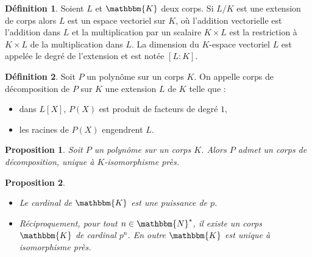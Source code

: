 \documentclass[12pt]{article}
\newcommand{\N}{\mathbbm{N}}
\newcommand{\K}{\mathbbm{K}}
\newtheorem{prop}{Proposition}
\theoremstyle{definition}
\newtheorem{definition}{Définition}
\begin{document}
\begin{definition}
Soient $L$ et $\K$ deux corps. Si $L/K$ est une extension de corps alors $L$ est un espace vectoriel sur $K$, où l'addition vectorielle est l'addition dans $L$ et la multiplication par un scalaire $K \times L$ est la restriction à $K \times L$ de la multiplication dans $L$. La dimension du $K$-espace vectoriel $L$ est appelée le degré de l'extension et est notée $[L:K]$.
\end{definition}
\vspace{12pt}
\begin{definition}
Soit $P$ un polynôme sur un corps $K$. On appelle corps de décomposition de $P$ sur $K$ une extension $L$ de $K$ telle que :
\begin{itemize}
\item dans $L[X]$, $P(X)$ est produit de facteurs de degré $1$,
\item les racines de $P(X)$ engendrent $L$.
\end{itemize}
\end{definition}
\vspace{12pt}
\begin{prop}
Soit $P$ un polynôme sur un corps $K$. Alors $P$ admet un corps de décomposition, unique à $K$-isomorphisme près.
\end{prop}
\vspace{30pt}
\begin{prop}\hspace{12pt}
\begin{itemize}
\item Le cardinal de $\K$ est une puissance de $p$.
\item Réciproquement, pour tout $n \in \N^{*}$, il existe un corps $\K$ de cardinal $p^n$. En outre $\K$ est unique à isomorphisme près.
\end{itemize}
\end{prop}
\end{document}

